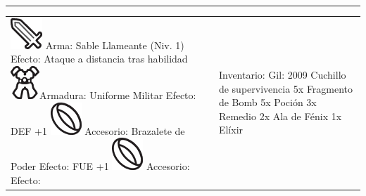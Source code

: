 \hrule 
\begin{tabularx}{\columnwidth}{XX}
	\noindent \newline
	\includegraphics[height=0.6\baselineskip]{./art/icons/weapon.png} Arma: Sable Llameante (Niv. 1) \newline 
	\indent Efecto: Ataque a distancia tras habilidad\newline \newline
	\includegraphics[height=0.6\baselineskip]{./art/icons/armor.png}Armadura: Uniforme Militar\newline
	\indent Efecto: DEF +1 \newline \newline
	\includegraphics[height=0.6\baselineskip]{./art/icons/acc.png} Accesorio: Brazalete de Poder \newline
	\indent Efecto: FUE +1\newline \newline
	\includegraphics[height=0.6\baselineskip]{./art/icons/acc.png} Accesorio:\newline
	\indent Efecto:\newline
	&
	\noindent \newline
	\indent Inventario: \hfill Gil: 2009 \hspace{1cm} \newline \newline
 Cuchillo de supervivencia \newline
 5x Fragmento de Bomb \newline
 5x Poción \newline
 3x Remedio \newline
 2x Ala de Fénix \newline
 1x Elíxir \newline
\end{tabularx}

\normalsize 
\standardgeometry

\twocolumn
\clearpage